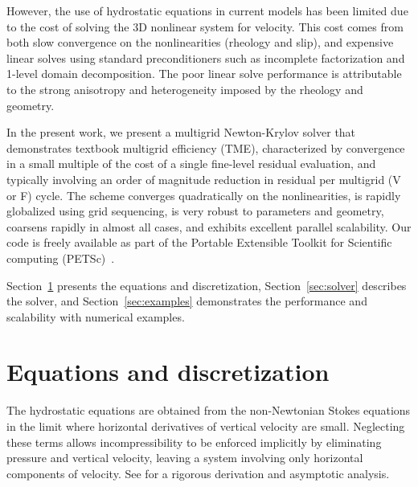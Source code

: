 \documentclass[10pt,letterpaper,oneeqnum,final]{siamltex}
\begin{document}
However, the use of hydrostatic equations in current models has been limited due to the cost of solving
the 3D nonlinear system for velocity.  This cost comes from both slow convergence on the
nonlinearities (rheology and slip), and expensive linear solves using standard preconditioners such
as incomplete factorization and 1-level domain decomposition.  The poor linear solve performance is
attributable to the strong anisotropy and heterogeneity imposed by the rheology and geometry.

In the present work, we present a multigrid Newton-Krylov solver that demonstrates textbook
multigrid efficiency (TME), characterized by convergence in a small multiple of the cost of a single
fine-level residual evaluation, and typically involving an order of magnitude reduction in residual
per multigrid (V or F) cycle.  The scheme converges quadratically on the nonlinearities, is rapidly
globalized using grid sequencing, is very robust to parameters and geometry, coarsens rapidly in
almost all cases, and exhibits excellent parallel scalability.  Our code is freely available as part
of the Portable Extensible Toolkit for Scientific computing (PETSc)~\cite{petsc-web-page}.

Section~\ref{sec:equations} presents the equations and discretization, Section~\ref{sec:solver}
describes the solver, and Section~\ref{sec:examples} demonstrates the performance and scalability
with numerical examples.

\section{Equations and discretization}\label{sec:equations}
The hydrostatic equations are obtained from the non-Newtonian Stokes equations in the limit where
horizontal derivatives of vertical velocity are small.  Neglecting these terms allows
incompressibility to be enforced implicitly by eliminating pressure and vertical velocity, leaving a
system involving only horizontal components of velocity.  See \cite{schoof2010thin} for a rigorous
derivation and asymptotic analysis.
\end{document}
